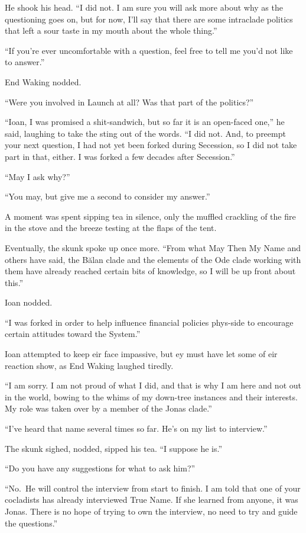 He shook his head. ``I did not. I am sure you will ask more about why as the questioning goes on, but for now, I'll say that there are some intraclade politics that left a sour taste in my mouth about the whole thing.''

``If you're ever uncomfortable with a question, feel free to tell me you'd not like to answer.''

End Waking nodded.

``Were you involved in Launch at all? Was that part of the politics?''

``Ioan, I was promised a shit-sandwich, but so far it is an open-faced one,'' he said, laughing to take the sting out of the words. ``I did not. And, to preempt your next question, I had not yet been forked during Secession, so I did not take part in that, either. I was forked a few decades after Secession.''

``May I ask why?''

``You may, but give me a second to consider my answer.''

A moment was spent sipping tea in silence, only the muffled crackling of the fire in the stove and the breeze testing at the flaps of the tent.

Eventually, the skunk spoke up once more. ``From what May Then My Name and others have said, the Bălan clade and the elements of the Ode clade working with them have already reached certain bits of knowledge, so I will be up front about this.''

Ioan nodded.

``I was forked in order to help influence financial policies phys-side to encourage certain attitudes toward the System.''

Ioan attempted to keep eir face impassive, but ey must have let some of eir reaction show, as End Waking laughed tiredly.

``I am sorry. I am not proud of what I did, and that is why I am here and not out in the world, bowing to the whims of my down-tree instances and their interests. My role was taken over by a member of the Jonas clade.''

``I've heard that name several times so far. He's on my list to interview.''

The skunk sighed, nodded, sipped his tea. ``I suppose he is.''

``Do you have any suggestions for what to ask him?''

``No.~He will control the interview from start to finish. I am told that one of your cocladists has already interviewed True Name. If she learned from anyone, it was Jonas. There is no hope of trying to own the interview, no need to try and guide the questions.''


